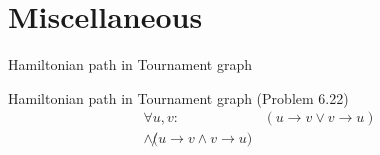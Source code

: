 \section{Miscellaneous}

\begin{frame}{Hamiltonian path in Tournament graph}
  \begin{exampleblock}{Hamiltonian path in Tournament graph (Problem 6.22)}
	\begin{align}
	  \forall u, v: &(u \to v \lor v \to u) \\
	  	\land \not(u \to v \land v \to u)
	\end{align}
  \end{exampleblock}
\end{frame}

